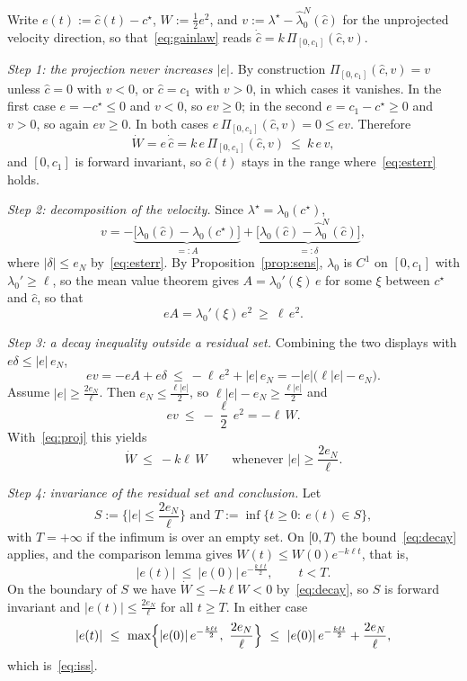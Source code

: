 \documentclass[letterpaper, 10pt, conference]{ieeeconf}
\makeatletter
\newcommand{\rev}[1]{#1}
\newcommand{\pl}[1]{#1}
\renewenvironment{proof}[1][\proofname]{\par
  \pushQED{\qed}%
  \normalfont\topsep6\p@\@plus6\p@\relax
  \trivlist
  \item[\hskip\labelsep\itshape #1\@addpunct{.}]\ignorespaces
}{%
  \popQED\endtrivlist\@endpefalse
}
\renewenvironment{proof}[1][\proofname]{\par
  \pushQED{\qed}%
  \normalfont\topsep6\p@\@plus6\p@\relax
  \trivlist
  \item[\hskip\labelsep\itshape #1\@addpunct{.}]\ignorespaces
}{%
  \popQED\endtrivlist\@endpefalse
}
\makeatother
\begin{document}
\begin{proof}
\rev{Write $e(t):=\widehat c(t)-c^\star$, $W:=\frac{1}{2}e^2$, and
$v:=\lambda^\star-\widehat\lambda_0^N(\widehat c)$ for the unprojected velocity
direction, so that~\eqref{eq:gainlaw} reads
$\dot{\widehat c}=k\,\Pi_{[0,c_1]}(\widehat c,v)$.}

\rev{\emph{Step 1: the projection never increases $|e|$.} By construction
$\Pi_{[0,c_1]}(\widehat c,v)=v$ unless $\widehat c=0$ with $v<0$, or
$\widehat c=c_1$ with $v>0$, in which cases it vanishes. In the first case
$e=-c^\star\le0$ and $v<0$, so $ev\ge0$; in the second $e=c_1-c^\star\ge0$ and
$v>0$, so again $ev\ge0$. In both cases $e\,\Pi_{[0,c_1]}(\widehat c,v)=0\le ev$.
Therefore}
\begin{equation}
\rev{\dot W=e\,\dot{\widehat c}=k\,e\,\Pi_{[0,c_1]}(\widehat c,v)\ \le\ k\,e\,v ,}
\label{eq:proj}
\end{equation}
\rev{and $[0,c_1]$ is forward invariant, so $\widehat c(t)$ stays in the range
where~\eqref{eq:esterr} holds.}

\rev{\emph{Step 2: decomposition of the velocity.} Since
$\lambda^\star=\lambda_0(c^\star)$,}
\[
v=-\underbrace{\bigl[\lambda_0(\widehat c)-\lambda_0(c^\star)\bigr]}_{=:A}
+\underbrace{\bigl[\lambda_0(\widehat c)-\widehat\lambda_0^N(\widehat c)\bigr]}_{=:\delta} ,
\]
\rev{where $|\delta|\le e_N$ by~\eqref{eq:esterr}. By
Proposition~\ref{prop:sens}, $\lambda_0$ is $C^1$ on $[0,c_1]$ with
$\lambda_0'\ge\ell$, so the mean value theorem gives
$A=\lambda_0'(\xi)\,e$ for some $\xi$ between $c^\star$ and $\widehat c$, \pl{so that}}
\[
eA=\lambda_0'(\xi)\,e^2\ \ge\ \ell\,e^2 .
\]

\rev{\emph{Step 3: a decay inequality outside a residual set.} Combining the
two displays with $e\delta\le|e|\,e_N$,}
\[
ev=-eA+e\delta\ \le\ -\ell\,e^2+|e|\,e_N
=-|e|\bigl(\ell|e|-e_N\bigr).
\]
\rev{Assume $|e|\ge\frac{2e_N}{\ell}$. Then $e_N\le\frac{\ell|e|}{2}$, so
$\ell|e|-e_N\ge\frac{\ell|e|}{2}$ and}
\[
ev\ \le\ -\frac{\ell}{2}\,e^2=-\ell\,W .
\]
\rev{With~\eqref{eq:proj} this yields}
\begin{equation}
\rev{\dot W\ \le\ -k\ell\,W
\qquad\text{whenever }|e|\ge\frac{2e_N}{\ell}.}
\label{eq:decay}
\end{equation}

\rev{\emph{Step 4: invariance of the residual set and conclusion.} Let
\[
S:=\bigl\{|e|\le\frac{2e_N}{\ell}\bigr\} \text{ and } T:=\inf\{t\ge0:\ e(t)\in S\},
\]
with $T=+\infty$ if the infimum is over an
empty set. On $[0,T)$ the bound~\eqref{eq:decay} applies, and the comparison
lemma gives $W(t)\le W(0)e^{-k\ell t}$, that is,}
\[
|e(t)|\ \le\ |e(0)|\,e^{-\frac{k\ell t}{2}},\qquad t<T .
\]
\rev{On the boundary of $S$ we have $\dot W\le-k\ell W<0$ by~\eqref{eq:decay},
so $S$ is forward invariant and $|e(t)|\le\frac{2e_N}{\ell}$ for all $t\ge T$.
In either case}
\[
|e(t)|\ \le\ \max\Bigl\{|e(0)|\,e^{-\frac{k\ell t}{2}},\ \frac{2e_N}{\ell}\Bigr\}
\ \le\ |e(0)|\,e^{-\frac{k\ell t}{2}}+\frac{2e_N}{\ell},
\]
\rev{which is~\eqref{eq:iss}.}


\end{proof}
\end{document}
